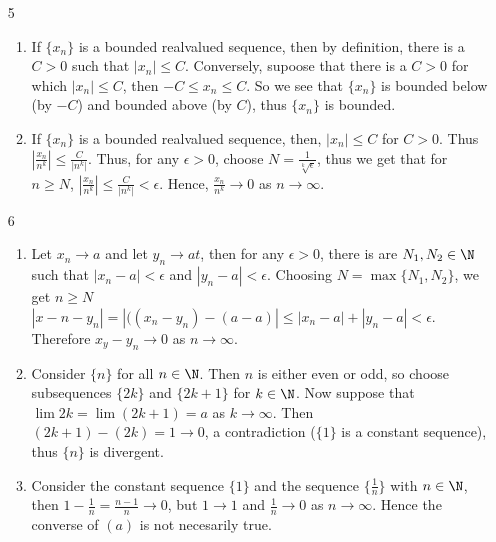 \begin{enumerate}[label=(\arabic*)]
    \item[5]
        \begin{enumerate}
            \item If $\{x_n\}$ is a bounded realvalued sequence, then by definition, 
            there is a  $C>0$ such that  $|x_n| \leq C$. Conversely, supoose that 
            there is a $C>0$ for which  $|x_n| \leq C$, then  $-C \leq x_n \leq C$. So 
            we see that  $\{x_n\}$ is bounded below  (by $-C$) and bounded above 
            (by $C$), thus $\{x_n\}$ is bounded.

            \item If $\{x_n\}$ is a bounded realvalued sequence, then, $|x_n| \leq C$ 
            for $C>0$. Thus  $|\frac{x_n}{n^k}| \leq \frac{C}{|n^k|}$. Thus, for 
            any $\epsilon>0$, choose  $N=\frac{1}{\sqrt[k]{\epsilon}}$, thus we get that for 
            $n \geq N$,  $|\frac{x_n}{n^k}| \leq \frac{C}{|n^k|}<\epsilon$. Hence, $\frac{x_n}{n^k} 
            \rightarrow 0$ as $n \rightarrow \infty$.
        \end{enumerate}

    \item[6]
        \begin{enumerate}
            \item Let $x_n \rightarrow a$ and let  $y_n \rightarrow at$, then for any  $\epsilon>0$, there 
            is are  $N_1,N_2 \in \N$ such that $|x_n-a|<\epsilon$ and  $|y_n-a|<\epsilon$. 
            Choosing  $N=\max\{N_1,N_2\}$, we get  $n \geq N$  $|x-n-y_n|=|((x_n-y_n)
            -(a-a)| \leq |x_n-a|+|y_n-a|<\epsilon$. Therefore  $x_y-y_n \rightarrow 0$ as  $n \rightarrow \infty$.

        \item Consider $\{n\}$ for all $n \in \N$. Then  $n$ is either even or odd, 
            so choose subsequences $\{2k\}$ and  $\{2k+1\}$ for  $k \in \N$. Now 
            suppose that  $\lim{2k}=\lim{(2k+1)}=a$ as  $k \rightarrow \infty$. 
            Then $(2k+1)-(2k)=1 \rightarrow 0$, a contradiction ($\{1\}$ is a constant 
            sequence), thus  $\{n\}$ is divergent.

        \item Consider the constant sequence  $\{1\}$ and the sequence  $\{\frac{1}{n}\}$ 
            with $n \in \N$, then  $1-\frac{1}{n}=\frac{n-1}{n} \rightarrow 0$, 
            but $1 \rightarrow 1$ and $\frac{1}{n} \rightarrow 0$ as $n \rightarrow \infty$. 
            Hence the converse of  $(a)$ is not necesarily true.
        \end{enumerate}
\end{enumerate}

